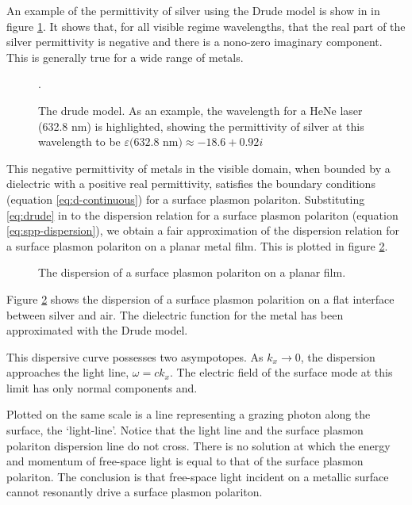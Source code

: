 \documentclass[oneside,10pt,a4paper]{book}
\begin{document}
An example of the permittivity of silver using the Drude model is show in in figure \ref{fig:drude}. It shows that, for all visible regime wavelengths, that the real part of the silver permittivity is negative and there is a nono-zero imaginary component. This is generally true for a wide range of metals.
\begin{figure}
\begin{center}

\caption{\label{fig:drude}The drude model. As an example, the wavelength for a HeNe laser (632.8 nm) is highlighted, showing the permittivity of silver at this wavelength to be $\varepsilon(632.8$ nm$) \approx -18.6+0.92i$}.
\end{center}
\end{figure}
This negative permittivity of metals in the visible domain, when bounded by a dielectric with a positive real permittivity, satisfies the boundary conditions (equation \ref{eq:d-continuous}) for a surface plasmon polariton. Substituting \ref{eq:drude} in to the dispersion relation for a surface plasmon polariton  (equation \ref{eq:spp-dispersion}), we obtain a fair approximation of the dispersion relation for a surface plasmon polariton on a planar metal film. This is plotted in figure \ref{fig:spp-dispersion}.
\begin{figure}
\begin{center}

\caption{\label{fig:spp-dispersion}The dispersion of a surface plasmon polariton on a planar film.}
\end{center}
\end{figure}
Figure \ref{fig:spp-dispersion} shows the dispersion of a surface plasmon polarition on a flat interface between silver and air. The dielectric function for the metal has been approximated with the Drude model. 

This dispersive curve possesses two asympotopes. As $k_x\to 0$, the dispersion approaches the light line, $\omega=ck_x$. The electric field of the surface mode at this limit has only normal components and.

Plotted on the same scale is a line representing a grazing photon along the surface, the `light-line'.  Notice that the light line and the surface plasmon polariton dispersion line do not cross. There is no solution at which the energy and momentum of free-space light is equal to that of the surface plasmon polariton. The conclusion is that free-space light incident on a metallic surface cannot resonantly drive a surface plasmon polariton. 
\end{document}
